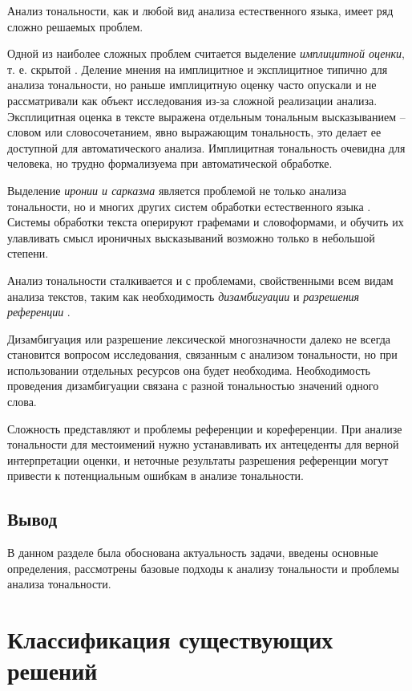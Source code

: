 \documentclass[a4paper,14pt, unknownkeysallowed]{extreport}
\begin{document}
Анализ тональности, как и любой вид анализа естественного языка, имеет ряд сложно решаемых проблем.

Одной из наиболее сложных проблем считается выделение \textit{имплицитной оценки}, т. е. скрытой \cite{Semina2}. Деление мнения на имплицитное и эксплицитное типично для анализа тональности, но раньше имплицитную оценку часто опускали и не рассматривали как объект исследования из-за сложной реализации анализа. Эксплицитная оценка в тексте выражена отдельным тональным высказыванием -- словом или словосочетанием, явно выражающим тональность, это делает ее доступной для автоматического анализа. Имплицитная тональность очевидна для человека, но трудно формализуема при автоматической обработке. 

Выделение \textit{иронии и сарказма} является проблемой не только анализа тональности, но и многих других систем обработки естественного языка \cite{Semina2}. Системы обработки текста оперируют графемами и словоформами, и обучить их улавливать смысл ироничных высказываний возможно только в небольшой степени.

Анализ тональности сталкивается и с проблемами, свойственными всем видам анализа текстов, таким как необходимость
\textit{дизамбигуации} и \textit{разрешения референции} \cite{Semina2}.

Дизамбигуация или разрешение лексической многозначности далеко не всегда становится вопросом исследования, связанным с анализом тональности, но при использовании отдельных ресурсов она будет необходима. Необходимость проведения дизамбигуации связана с разной тональностью значений одного слова.

Сложность представляют и проблемы референции и кореференции. При анализе тональности для местоимений нужно устанавливать их антецеденты для верной интерпретации оценки, и неточные результаты разрешения референции могут привести к потенциальным ошибкам в анализе тональности. 

\section{Вывод}

В данном разделе была обоснована актуальность задачи, введены основные определения, рассмотрены базовые подходы к анализу тональности и проблемы анализа тональности.

\chapter{Классификация существующих решений}
\end{document}
